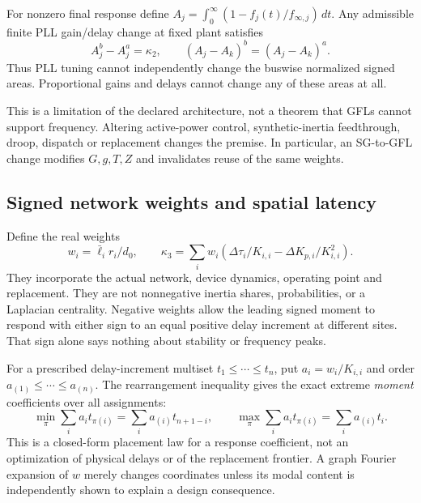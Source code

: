 \begin{corollary}
For nonzero final response define
$A_j=\int_0^\infty(1-f_j(t)/f_{\infty,j})\,dt$.
Any admissible finite PLL gain/delay change at fixed plant satisfies
\[
 A_j^b-A_j^a=\kappa_2,\qquad
 (A_j-A_k)^b=(A_j-A_k)^a.
\]
Thus PLL tuning cannot independently change the buswise normalized signed
areas. Proportional gains and delays cannot change any of these areas at all.
\end{corollary}
This is a limitation of the declared architecture, not a theorem that GFLs
cannot support frequency. Altering active-power control, synthetic-inertia
feedthrough, droop, dispatch or replacement changes the premise. In particular,
an SG-to-GFL change modifies $G,g,T,Z$ and invalidates reuse of the same weights.

\subsection{Signed network weights and spatial latency}
Define the real weights
\begin{equation}
 w_i=\bar\ell_i r_i/d_0,\qquad
 \kappa_3=\sum_iw_i\left(\Delta\tau_i/K_{i,i}
                          -\Delta K_{p,i}/K_{i,i}^2\right).
 \label{eq:networkweights}
\end{equation}
They incorporate the actual network, device dynamics, operating point and
replacement. They are not nonnegative inertia shares, probabilities, or a
Laplacian centrality. Negative weights allow the leading signed moment to
respond with either sign to an equal positive delay increment at different
sites. That sign alone says nothing about stability or frequency peaks.

For a prescribed delay-increment multiset $t_1\le\cdots\le t_n$, put
$a_i=w_i/K_{i,i}$ and order $a_{(1)}\le\cdots\le a_{(n)}$.
The rearrangement inequality gives the exact extreme \emph{moment} coefficients
over all assignments:
\[
 \min_\pi\sum_i a_it_{\pi(i)}=\sum_i a_{(i)}t_{n+1-i},\qquad
 \max_\pi\sum_i a_it_{\pi(i)}=\sum_i a_{(i)}t_i.
\]
This is a closed-form placement law for a response coefficient, not an
optimization of physical delays or of the replacement frontier. A graph
Fourier expansion of $w$ merely changes coordinates unless its modal content
is independently shown to explain a design consequence.

